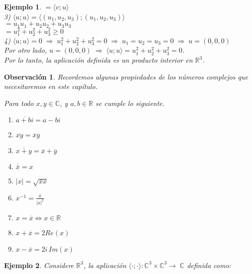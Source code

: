 \documentclass[12pt]{book}
\newtheorem{obs}{Observaci\'on}
\newtheorem{ejem}{Ejemplo}
\def\R{\mathbb{R}}
\def\C{\mathbb{C}}
\begin{document}
{\begin{ejem}
{\hspace{1.6 cm}$=\langle v; u \rangle$\\

3) $\langle u; u \rangle=\langle (u_1,u_2,u_3);(u_1,u_2,u_3)\rangle$\\

\hspace{1.6 cm}$=u_1u_1+u_2u_2+u_3u_3$\\

\hspace{1.6 cm}$=u_1^2+u_2^2+u_3^2\geq 0$\\

4) $\langle u; u \rangle=0\;\Rightarrow\;u_1^2+u_2^2+u_3^2=0\;\Rightarrow\;u_1=u_2=u_3=0\;\Rightarrow\;u=(0,0,0)$\\

Por otro lado, $u=(0,0,0)\;\Rightarrow\;\langle u;u\rangle =u_1^2+u_2^2+u_3^2=0$.\\

Por lo tanto, la aplicaci\'on definida es un producto interior en $\R^3$.


}
\end{ejem}

\begin{obs}
Recordemos algunas propiedades de los n\'umeros complejos que necesitaremos en este capítulo.

Para todo $x,y\in\C$, y $a,b\in \R$ se cumple lo siguiente.\\

\begin{multicols}{3}
\begin{enumerate}
\item $\overline{a+bi}=a-bi$
\item $\overline{xy}=\overline{x}\overline{y}$
\item $\overline{x+y}=\overline{x}+\overline{y}$
\item $\overline{\overline{x}}=x$
\item $|x|=\sqrt{\overline{x}x}$
\item $x^{-1}=\frac{\overline{x}}{|x|^2}$
\item $x=\overline{x}\Leftrightarrow x\in \R$
\item $x+\overline{x}=2Re(x)$
\item $x-\overline{x}=2i\,Im(x)$
\end{enumerate}
\end{multicols}
\end{obs}


\begin{ejem}
Considere $\R^3$, la aplicaci\'on $\langle \cdot; \cdot \rangle:\C^3\times \C^3\rightarrow\;\C$ definida como:
 

\end{ejem}}
\end{document}

